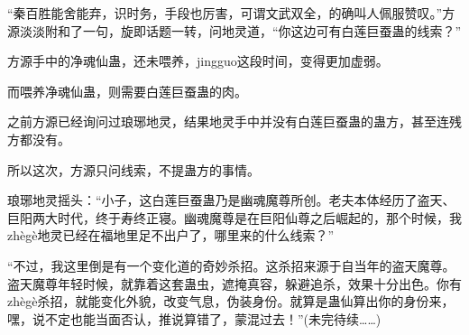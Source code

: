 \begin{this_body}
“秦百胜能舍能弃，识时务，手段也厉害，可谓文武双全，的确叫人佩服赞叹。”方源淡淡附和了一句，旋即话题一转，问地灵道，“你这边可有白莲巨蚕蛊的线索？”

方源手中的净魂仙蛊，还未喂养，jingguo这段时间，变得更加虚弱。

而喂养净魂仙蛊，则需要白莲巨蚕蛊的肉。

之前方源已经询问过琅琊地灵，结果地灵手中并没有白莲巨蚕蛊的蛊方，甚至连残方都没有。

所以这次，方源只问线索，不提蛊方的事情。

琅琊地灵摇头：“小子，这白莲巨蚕蛊乃是幽魂魔尊所创。老夫本体经历了盗天、巨阳两大时代，终于寿终正寝。幽魂魔尊是在巨阳仙尊之后崛起的，那个时候，我zhègè地灵已经在福地里足不出户了，哪里来的什么线索？”

“不过，我这里倒是有一个变化道的奇妙杀招。这杀招来源于自当年的盗天魔尊。盗天魔尊年轻时候，就靠着这套蛊虫，遮掩真容，躲避追杀，效果十分出色。你有zhègè杀招，就能变化外貌，改变气息，伪装身份。就算是蛊仙算出你的身份来，嘿，说不定也能当面否认，推说算错了，蒙混过去！”(未完待续……)

\end{this_body}

